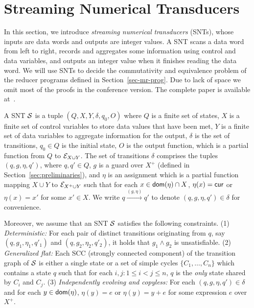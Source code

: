 


\section{Streaming Numerical Transducers}\label{sec:def-snt}

In this section, we introduce \emph{streaming numerical transducers} (SNTs), whose inputs are data words and outputs are integer values. A SNT scans a data word from left to right, records and aggregates some information using control and data variables, and outputs an integer value when it finishes reading the data word. We will use SNTs to decide the commutativity and equivalence problem of the reducer programs defined in Section~\ref{sec-mr-prog}. 
Due to lack of space we omit most of the proofs in the conference version. The complete paper is available at~\cite{full-version}. 


A SNT ${\mathcal{S} }$ is a tuple $(Q, X, Y, \delta, q_0, O)$ where $Q$ is a finite set of states, $X$ is a finite set of control variables to store data values that have been met, $Y$ is a finite set of data variables to aggregate information for the output, $\delta$ is the set of transitions, $q_0 \in Q$ is the initial state, $O$ is the output function, which is a partial function from $Q$ to ${\mathcal{E} }_{X \cup Y}$.%
The set of transitions $\delta$ comprises the tuples $(q,  g, \eta, q')$, where $q,q'\in Q$, $g$ is a guard over $X^+$ (defined in Section~\ref{sec:preliminaries}), and $\eta$ is an assignment which is a partial function mapping $X \cup Y$  to ${\mathcal{E} }_{X^+ \cup Y}$ such that for each $x \in \mathsf{dom}(\eta) \cap X$, $\eta(x)=\mathsf{cur}$ or $\eta(x) = x'$ for some $x' \in X$. We write $q \xrightarrow{(g,\eta)} q'$ to denote $(q,g,\eta,q') \in \delta$ for convenience. 

Moreover, we assume that an SNT ${\mathcal{S} }$ satisfies the following constraints. (1) \emph{Deterministic:} For each pair of distinct transitions originating from $q$, say $(q, g_1, \eta_1,q'_1)$ and $(q, g_2,\eta_2,q'_2)$, it holds that $g_1 \wedge g_2$ is unsatisfiable. (2) \emph{Generalized flat:} Each SCC (strongly connected component) of the transition graph of ${\mathcal{S} }$ is either a single state or a set of simple cycles $\{C_1,\dots, C_n\}$ which contains a state $q$ such that for each $i,j: 1 \le i < j \le n$, $q$ is the \emph{only} state shared by $C_i$ and $C_j$. (3) \emph{Independently evolving and copyless:} For each $(q, g, \eta, q') \in \delta$ and for each $y \in \mathsf{dom}(\eta)$, $\eta(y)=e$ or $\eta(y)=y+e$ for some expression $e$ over $X^+$.

